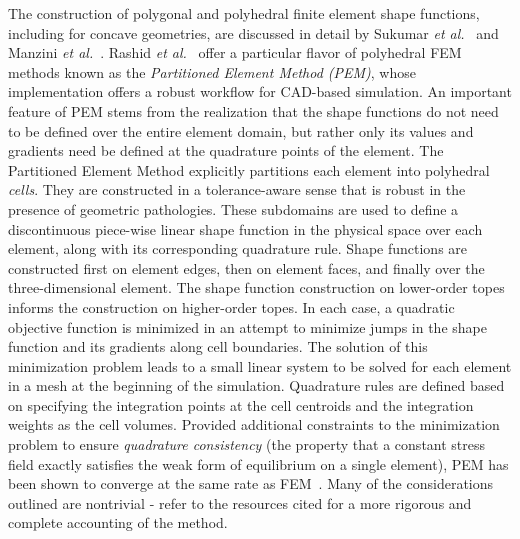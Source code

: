 The construction of polygonal and polyhedral finite element shape functions, including for concave geometries, are discussed in detail by Sukumar \textit{et al.}~\cite{sukumar_2006} and Manzini \textit{et al.}~\cite{manzini_2014}. Rashid \textit{et al.}~\cite{rashid_2012, rashid_2015} offer a particular flavor of polyhedral FEM methods known as the \textit{Partitioned Element Method (PEM)}, whose implementation offers a robust workflow for CAD-based simulation. An important feature of PEM stems from the realization that the shape functions do not need to be defined over the entire element domain, but rather only its values and gradients need be defined at the quadrature points of the element. The Partitioned Element Method explicitly partitions each element into polyhedral \textit{cells}. They are constructed in a tolerance-aware sense that is robust in the presence of geometric pathologies. These subdomains are used to define a discontinuous piece-wise linear shape function in the physical space over each element, along with its corresponding quadrature rule. Shape functions are constructed first on element edges, then on element faces, and finally over the three-dimensional element. The shape function construction on lower-order topes informs the construction on higher-order topes. In each case, a quadratic objective function is minimized in an attempt to minimize jumps in the shape function and its gradients along cell boundaries. The solution of this minimization problem leads to a small linear system to be solved for each element in a mesh at the beginning of the simulation. Quadrature rules are defined based on specifying the integration points at the cell centroids and the integration weights as the cell volumes. Provided additional constraints to the minimization problem to ensure \textit{quadrature consistency} (the property that a constant stress field exactly satisfies the weak form of equilibrium on a single element), PEM has been shown to converge at the same rate as FEM~\cite{rashid_2012}. Many of the considerations outlined are nontrivial - refer to the resources cited for a more rigorous and complete accounting of the method.

